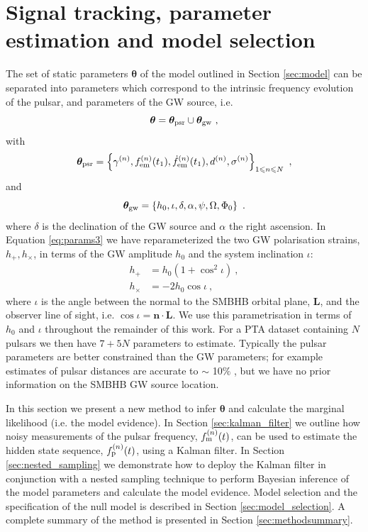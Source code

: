 \documentclass[fleqn,usenatbib,useAMS]{mnras}
\begin{document}
\section{Signal tracking, parameter estimation and model selection} \label{sec:detect}
The set of static parameters $\boldsymbol{\theta}$ of the model outlined in Section \ref{sec:model} can be separated into parameters which correspond to the intrinsic frequency evolution of the pulsar, and parameters of the GW source, i.e. 
\begin{equation}
	\boldsymbol{\theta} =  \boldsymbol{\theta}_{\rm psr} \cup \boldsymbol{\theta}_{\rm gw} \ , \label{eq:params1}
\end{equation}
with
\begin{equation}
	\boldsymbol{\theta}_{\rm psr} = \left \{ \gamma^{(n)}, f_{\rm em}^{(n)}(t_1),\dot{f}_{\rm em}^{(n)}(t_1),d^{(n)},\sigma^{(n)}\right\}_{1\leq n \leq N} \ , \label{eq:psrparams}
\end{equation}
and
\begin{equation}
	\boldsymbol{\theta}_{\rm gw} = \left \{h_0, \iota, \delta, \alpha, \psi, \Omega, \Phi_0 \right \} \ .  \label{eq:params3}
\end{equation}
where $\delta$ is the declination of the GW source and $\alpha$ the right ascension. In Equation \eqref{eq:params3} we have reparameterized the two GW polarisation strains, $h_{+}, h_{\times}$, in terms of the GW amplitude $h_0$ and the system inclination $\iota$:
\begin{align}
	h_+ &= h_0(1 + \cos^2 \iota) 	\label{eq:hphx} \ ,\\
	h_{\times} &= -2h_0\cos \iota 	\label{eq:hphx2} \ , 
\end{align}
where $\iota$ is the angle between the normal to the SMBHB orbital plane, $\boldsymbol{L}$, and the observer line of sight, i.e. $\cos \iota = \boldsymbol{n} \cdot \boldsymbol{L}$. We use this parametrisation in terms of $h_0$ and $\iota$ throughout the remainder of this work. For a PTA dataset containing $N$ pulsars we then have $7 + 5N$ parameters to estimate. Typically the pulsar parameters are better constrained than the GW parameters; for example estimates of pulsar distances are accurate to $\sim$ 10$\%$ \citep{Cordes2002astro.ph..7156C, Verbiest2012ApJ...755...39V, Desvignes2016,Yao2017}, but we have no prior information on the SMBHB GW source location.  \newline 

In this section we present a new method to infer $\boldsymbol{\theta}$ and calculate the marginal likelihood (i.e. the model evidence). In Section \ref{sec:kalman_filter} we outline how noisy measurements of the pulsar frequency, $f_{\rm m}^{(n)}(t)$, can be used to estimate the hidden state sequence, $f_{\rm p}^{(n)}(t)$, using a Kalman filter. In Section \ref{sec:nested_sampling} we demonstrate how to deploy the Kalman filter in conjunction with a nested sampling technique to perform Bayesian inference of the model parameters and calculate the model evidence. Model selection and the specification of the null model is described in Section \ref{sec:model_selection}. A complete summary of the method is presented in Section \ref{sec:methodsummary}.
\end{document}
